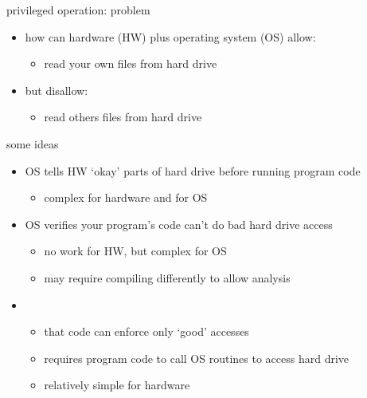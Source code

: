 \begin{frame}{privileged operation: problem}
\begin{itemize}
\item how can hardware (HW) plus operating system (OS) allow:
    \begin{itemize}
    \item read your own files from hard drive
    \end{itemize}
\item but disallow:
    \begin{itemize}
    \item read others files from hard drive
    \end{itemize}
\end{itemize}
\end{frame}

\begin{frame}{some ideas}
\begin{itemize}
\item<1-> OS tells HW `okay' parts of hard drive before running program code
    \begin{itemize}
    \item complex for hardware and for OS
    \end{itemize}
\item<2-> OS verifies your program's code can't do bad hard drive access 
    \begin{itemize}
    \item no work for HW, but complex for OS
    \item may require compiling differently to allow analysis
    \end{itemize}
\item<3-> 
    \begin{itemize}
    \item that code can enforce only `good' accesses
    \item requires program code to call OS routines to access hard drive
    \item relatively simple for hardware 
    \end{itemize}
\end{itemize}
\end{frame}


